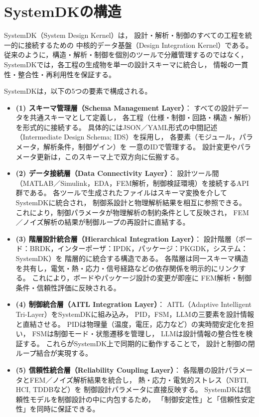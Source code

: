 \section{SystemDKの構造}

SystemDK（System Design Kernel）は，
設計・解析・制御のすべての工程を統一的に接続するための
中核的データ基盤（Design Integration Kernel）である。
従来のように，構造・解析・制御を個別のツールで分離管理するのではなく，
SystemDKでは，各工程の生成物を単一の設計スキーマに統合し，
情報の一貫性・整合性・再利用性を保証する。

\vspace{0.5em}
\noindent SystemDKは，以下の5つの要素で構成される。

\begin{itemize}
  \item \textbf{(1) スキーマ管理層（Schema Management Layer）}：  
  すべての設計データを共通スキーマとして定義し，
  各工程（仕様・制御・回路・構造・解析）を形式的に接続する。
  具体的にはJSON／YAML形式の中間記述（Intermediate Design Schema; IDS）を採用し，
  各要素（モジュール，パラメータ，解析条件，制御ゲイン）を
  一意のIDで管理する。
  設計変更やパラメータ更新は，このスキーマ上で双方向に伝搬する。

  \item \textbf{(2) データ接続層（Data Connectivity Layer）}：  
  設計ツール間（MATLAB／Simulink，EDA，FEM解析，制御検証環境）を接続するAPI群である。
  各ツールで生成されたファイルはスキーマ変換を介してSystemDKに統合され，
  制御系設計と物理解析結果を相互に参照できる。
  これにより，制御パラメータが物理解析の制約条件として反映され，
  FEM／ノイズ解析の結果が制御ループの再設計に直結する。

  \item \textbf{(3) 階層設計統合層（Hierarchical Integration Layer）}：  
  設計階層（ボード：BRDK，インターポーザ：IPDK，パッケージ：PKGDK，システム：SystemDK）を
  階層的に統合する構造である。
  各階層は同一スキーマ構造を共有し，電気・熱・応力・信号経路などの依存関係を明示的にリンクする。
  これにより，ボードやパッケージ設計の変更が即座に
  FEM解析・制御条件・信頼性評価に反映される。

  \item \textbf{(4) 制御統合層（AITL Integration Layer）}：  
  AITL（Adaptive Intelligent Tri-Layer）をSystemDKに組み込み，
  PID，FSM，LLMの三要素を設計情報と直結させる。
  PIDは物理量（温度，電圧，応力など）の実時間安定化を担い，
  FSMは制御モード・状態遷移を管理し，
  LLMは設計情報の整合性を検証する。
  これらがSystemDK上で同期的に動作することで，
  設計と制御の閉ループ結合が実現する。

  \item \textbf{(5) 信頼性統合層（Reliability Coupling Layer）}：  
  各階層の設計パラメータとFEM／ノイズ解析結果を統合し，
  熱・応力・電気的ストレス（NBTI, HCI, TDDBなど）を
  制御設計パラメータに直接反映する。
  SystemDKは信頼性モデルを制御設計の中に内包するため，
  「制御安定性」と「信頼性安定性」を同時に保証できる。
\end{itemize}

